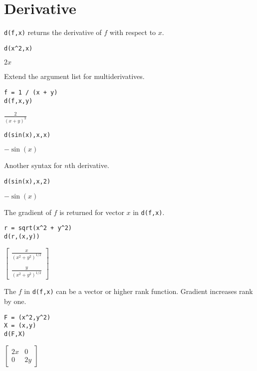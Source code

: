 \documentclass[12pt]{article}
\begin{document}
\newpage

\section{Derivative}

\verb$d(f,x)$ returns the derivative of $f$ with respect to $x$.

{\color{blue}
\begin{verbatim}
d(x^2,x)
\end{verbatim}}

$2x$

\bigskip
Extend the argument list for multiderivatives.

{\color{blue}
\begin{verbatim}
f = 1 / (x + y)
d(f,x,y)
\end{verbatim}}

$\displaystyle
\frac{2}{(x+y)^3}
$

{\color{blue}
\begin{verbatim}
d(sin(x),x,x)
\end{verbatim}}

$-\sin(x)$

\bigskip
Another syntax for $n$th derivative.

{\color{blue}
\begin{verbatim}
d(sin(x),x,2)
\end{verbatim}}

$-\sin(x)$

\bigskip
The gradient of $f$ is returned for vector $x$ in \verb$d(f,x)$.

{\color{blue}
\begin{verbatim}
r = sqrt(x^2 + y^2)
d(r,(x,y))
\end{verbatim}
}

$\displaystyle
\begin{bmatrix}
{\displaystyle \frac{x}{(x^2+y^2)^{1/2}}}
\\
\\
{\displaystyle \frac{y}{(x^2+y^2)^{1/2}}}
\end{bmatrix}
$

\bigskip
The $f$ in \verb$d(f,x)$ can be a vector or higher rank function.
Gradient increases rank by one.

{\color{blue}
\begin{verbatim}
F = (x^2,y^2)
X = (x,y)
d(F,X)
\end{verbatim}
}

$\displaystyle
\begin{bmatrix}
2x & 0
\\[1ex]
0 & 2y
\end{bmatrix}
$
\end{document}
